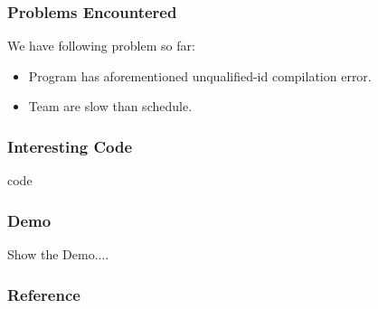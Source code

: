 \documentclass{beamer}
\begin{document}
\begin{frame}
  \frametitle{Problems Encountered}
  We have following problem so far:
  \begin{itemize}
    \item Program has aforementioned unqualified-id compilation error. 
    \item Team are slow than schedule.
  \end{itemize}
\end{frame}

\begin{frame}
  \frametitle{Interesting Code}
    code
\end{frame}

\begin{frame}
  \frametitle{Demo}
    Show the Demo....
\end{frame}

\begin{frame}
	\frametitle{Reference}
    \printbibliography
\end{frame}
\end{document}

